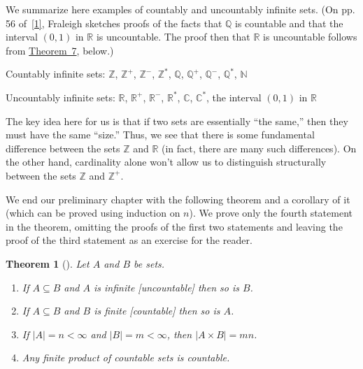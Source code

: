 \documentclass[10pt,openany,oneside]{book}
\theoremstyle{plain}
\newtheorem{theorem}{Theorem}[section]
\theoremstyle{definition}
\theoremstyle{definition}
\theoremstyle{definition}
\theoremstyle{definition}
\numberwithin{equation}{section}
\def\Z{\mathbb{Z}}
\def\R{\mathbb{R}}
\def\Q{\mathbb{Q}}
\def\C{\mathbb{C}}
\def\N{\mathbb{N}}
\newcommand{\lt}{<}
\begin{document}
We summarize here examples of countably and uncountably infinite sets. (On pp. 5\textendash{}6 of~\hyperlink{F}{[1]}, Fraleigh sketches proofs of the facts that \(\Q\) is countable and that the interval \((0,1)\) in \(\R\) is uncountable. The proof then that \(\R\) is uncountable follows from \hyperref[cardthm]{Theorem~7}, below.)%
\par
Countably infinite sets: \(\Z\), \(\Z^+\), \(\Z^-\), \(\Z^*\), \(\Q\), \(\Q^+\), \(\Q^-\), \(\Q^*\), \(\N\)%
\par
Uncountably infinite sets: \(\R\), \(\R^+\), \(\R^-\), \(\R^*\), \(\C\), \(\C^*\),  the interval \((0,1)\) in \(\R\)%
\par
The key idea here for us is that if two sets are essentially ``the same,'' then they must have the same ``size.'' Thus, we see that there is some fundamental difference between the sets \(\Z\) and \(\R\) (in fact, there are many such differences). On the other hand, cardinality alone won't allow us to distinguish structurally between the sets \(\Z\) and \(\Z^+\).%
\par
We end our preliminary chapter with the following theorem and a corollary of it (which can be proved using induction on \(n\)). We prove only the fourth statement in the theorem, omitting the proofs of the first two statements and leaving the proof of the third statement as an exercise for the reader.%
\begin{theorem}[{}]\label{cardthm}
Let \(A\) and \(B\) be sets. \leavevmode%
\begin{enumerate}
\item\hypertarget{li-19}{}If \(A\subseteq B\) and \(A\) is infinite [uncountable] then so is \(B\).%
\item\hypertarget{li-20}{}If \(A\subseteq B\) and \(B\) is finite [countable] then so is \(A\).%
\item\hypertarget{li-21}{}If \(|A|=n\lt \infty\) and \(|B|=m\lt  \infty\), then \(|A\times B|=mn\).%
\item\hypertarget{li-22}{}Any finite product of countable sets is countable.%
\end{enumerate}
%
\end{theorem}
\end{document}
